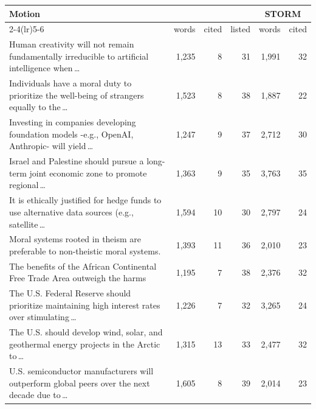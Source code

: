 \begin{tabular}{p{6.4cm}rrrrr}
\toprule
Motion & \multicolumn{3}{c}{\sys{}} & \multicolumn{2}{c}{STORM} \\
\cmidrule(lr){2-4}\cmidrule(lr){5-6}
 & words & cited & listed & words & cited \\
\midrule
Human creativity will not remain fundamentally irreducible to artificial intelligence when\,\ldots & 1{,}235 & 8 & 31 & 1{,}991 & 32 \\
Individuals have a moral duty to prioritize the well-being of strangers equally to the\,\ldots & 1{,}523 & 8 & 38 & 1{,}887 & 22 \\
Investing in companies developing foundation models -e.g., OpenAI, Anthropic- will yield\,\ldots & 1{,}247 & 9 & 37 & 2{,}712 & 30 \\
Israel and Palestine should pursue a long-term joint economic zone to promote regional\,\ldots & 1{,}363 & 9 & 35 & 3{,}763 & 35 \\
It is ethically justified for hedge funds to use alternative data sources (e.g., satellite\,\ldots & 1{,}594 & 10 & 30 & 2{,}797 & 24 \\
Moral systems rooted in theism are preferable to non-theistic moral systems. & 1{,}393 & 11 & 36 & 2{,}010 & 23 \\
The benefits of the African Continental Free Trade Area outweigh the harms & 1{,}195 & 7 & 38 & 2{,}376 & 32 \\
The U.S. Federal Reserve should prioritize maintaining high interest rates over stimulating\,\ldots & 1{,}226 & 7 & 32 & 3{,}265 & 24 \\
The U.S. should develop wind, solar, and geothermal energy projects in the Arctic to\,\ldots & 1{,}315 & 13 & 33 & 2{,}477 & 32 \\
U.S. semiconductor manufacturers will outperform global peers over the next decade due to\,\ldots & 1{,}605 & 8 & 39 & 2{,}014 & 23 \\
\bottomrule
\end{tabular}

